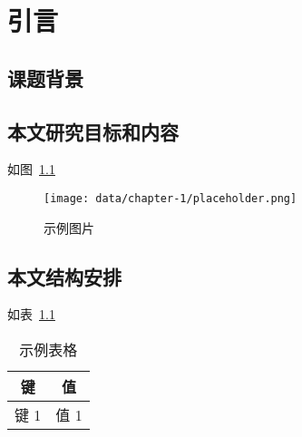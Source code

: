 
\chapter{引言}

\section{课题背景}

\cite{article1}

\section{本文研究目标和内容}

如图~\ref{figure:sample}

\begin{figure}[!htbp]
\centering
\texttt{[image: data/chapter-1/placeholder.png]}
\caption{示例图片}
\label{figure:sample}
\end{figure}

\section{本文结构安排}

如表~\ref{table:sample}

\begin{table}[!htbp]
\caption{示例表格}
\label{table:sample}
\centering
\begin{tabular}{|c|c|}
\hline
键 & 值 \\
\hline
键 1 & 值 1 \\
\hline
\end{tabular}
\end{table}
